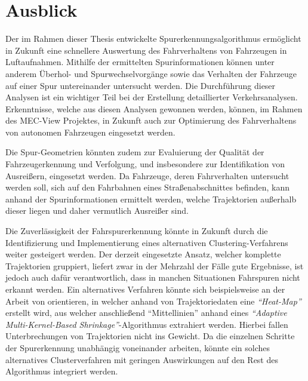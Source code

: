 \section{Ausblick}

Der im Rahmen dieser Thesis entwickelte Spurerkennungsalgorithmus ermöglicht in Zukunft eine schnellere Auswertung
des Fahrverhaltens von Fahrzeugen in Luftaufnahmen. Mithilfe der ermittelten Spurinformationen können
unter anderem Überhol- und Spurwechselvorgänge sowie das Verhalten der Fahrzeuge auf einer Spur
untereinander untersucht werden. Die Durchführung dieser Analysen ist ein wichtiger Teil bei der Erstellung
detaillierter Verkehrsanalysen. Erkenntnisse, welche aus diesen Analysen gewonnen werden, können, im
Rahmen des MEC-View Projektes, in Zukunft auch zur Optimierung des Fahrverhaltens von autonomen
Fahrzeugen eingesetzt werden.

Die Spur-Geometrien könnten zudem zur Evaluierung der Qualität der Fahrzeugerkennung und Verfolgung,
und insbesondere zur Identifikation von Ausreißern, eingesetzt werden.
Da Fahrzeuge, deren Fahrverhalten untersucht werden soll, sich auf den Fahrbahnen eines Straßenabschnittes befinden,
kann anhand der Spurinformationen ermittelt werden, welche Trajektorien außerhalb dieser liegen und
daher vermutlich Ausreißer sind.

Die Zuverlässigkeit der Fahrspurerkennung könnte in Zukunft durch die Identifizierung und Implementierung
eines alternativen Clustering-Verfahrens weiter gesteigert werden.
Der derzeit eingesetzte Ansatz, welcher komplette Trajektorien gruppiert, liefert zwar in der Mehrzahl der Fälle
gute Ergebnisse, ist jedoch auch dafür verantwortlich, dass in manchen Situationen Fahrspuren nicht erkannt werden.
Ein alternatives Verfahren könnte sich beispielsweise an der Arbeit von \cite[]{Xu2015} orientieren, in welcher
anhand von Trajektoriedaten eine \textit{``Heat-Map''} erstellt wird, aus welcher anschließend ``Mittellinien''
anhand eines \textit{``Adaptive Multi-Kernel-Based Shrinkage''}-Algorithmus extrahiert werden.
Hierbei fallen Unterbrechungen von Trajektorien nicht ins Gewicht.
Da die einzelnen Schritte der Spurerkennung unabhängig voneinander arbeiten, könnte ein
solches alternatives Clusterverfahren mit geringen Auswirkungen auf den Rest des Algorithmus integriert werden.